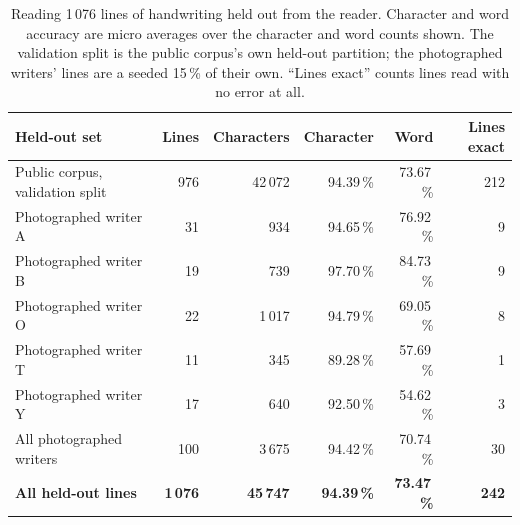 \begin{table}[h]
\centering
\fontsize{10}{12}\selectfont
\begin{tabular}{|l|r|r|r|r|r|}
\hline
\textbf{Held-out set} & \textbf{Lines} & \textbf{Characters} & \textbf{Character} & \textbf{Word} & \textbf{Lines exact} \\
\hline
Public corpus, validation split & 976 & 42\,072 & 94.39\,\% & 73.67\,\% & 212 \\
\hline
Photographed writer A &  31 &   934 & 94.65\,\% & 76.92\,\% &  9 \\
Photographed writer B &  19 &   739 & 97.70\,\% & 84.73\,\% &  9 \\
Photographed writer O &  22 & 1\,017 & 94.79\,\% & 69.05\,\% &  8 \\
Photographed writer T &  11 &   345 & 89.28\,\% & 57.69\,\% &  1 \\
Photographed writer Y &  17 &   640 & 92.50\,\% & 54.62\,\% &  3 \\
\hline
All photographed writers & 100 & 3\,675 & 94.42\,\% & 70.74\,\% & 30 \\
\hline
\textbf{All held-out lines} & \textbf{1\,076} & \textbf{45\,747} & \textbf{94.39\,\%} & \textbf{73.47\,\%} & \textbf{242} \\
\hline
\end{tabular}
\caption{Reading 1\,076 lines of handwriting held out from the reader.
Character and word accuracy are micro averages over the character and word
counts shown. The validation split is the public corpus's own held-out
partition; the photographed writers' lines are a seeded 15\,\% of their own.
``Lines exact'' counts lines read with no error at all.}
\label{tab:res-r2-text}
\end{table}

